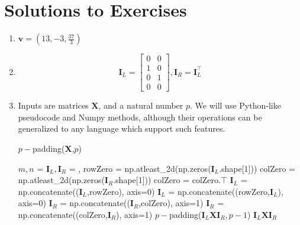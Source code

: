 \section{Solutions to Exercises}
\begin{enumerate}
    \item $\textbf{v} = (13,-3,\frac{37}{3})$
            
    \item $$\textbf{I}_L = \begin{bmatrix}
        0 & 0 \\ 1 & 0 \\ 0 & 1 \\ 0 & 0
    \end{bmatrix}, \textbf{I}_R = \textbf{I}_L^{\top}$$
    
    \item Inputs are matrices $\textbf{X}$, and a natural number $p$. We will use Python-like pseudocode and Numpy methods, although their operations can be generalized to any language which support such features.
    \begin{algorithm}
    \caption{$p-$padding(\textbf{X},$p$)}
    \begin{algorithmic}[1]
        \State $m,n$ = 
        \State $\textbf{I}_L, \textbf{I}_R$ = ,\;
        \State rowZero = np.atleast\_2d(np.zeros($\textbf{I}_L$.shape[1]))
        \State colZero = np.atleast\_2d(np.zeros($\textbf{I}_R$.shape[1]))
        \State colZero = colZero.$\top$
        \State $\textbf{I}_L$ = np.concatenate(($\textbf{I}_L$,rowZero), axis=0)
        \State $\textbf{I}_L$ = np.concatenate((rowZero,$\textbf{I}_L$), axis=0)
        \State $\textbf{I}_R$ = np.concatenate(($\textbf{I}_R$,colZero), axis=1)
        \State $\textbf{I}_R$ = np.concatenate((colZero,$\textbf{I}_R$), axis=1)
		\State \Return $p-$padding($\textbf{I}_L\textbf{X}\textbf{I}_R, p-1$)
		\EndIf
        \State \Return $\textbf{I}_L\textbf{X}\textbf{I}_R$
	\end{algorithmic} 
\end{algorithm}
\end{enumerate}








